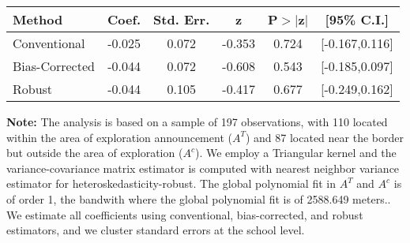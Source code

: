 \begin{table}[htbp]\centering
 \footnotesize 
\begin{tabular}{lccccc}
\hline\hline
Method & Coef. & Std. Err. & z & P$>|$z$|$ & [95\% C.I.] \\ 
\hline \hline  
Conventional & -0.025 & 0.072 & -0.353 & 0.724 & [-0.167,0.116] \\ 
 Bias-Corrected & -0.044 & 0.072 & -0.608 & 0.543 & [-0.185,0.097] \\ 
Robust & -0.044 & 0.105 & -0.417 & 0.677 & [-0.249,0.162] \\ 
  \hline\hline
\end{tabular}
\label{table:rd}
\begin{tablenotes} 
  \justifying \tiny \textbf{Note: }    
   The analysis is based on a sample of 197 observations, with 110 located within the area of exploration announcement ($A^{T}$) and 87 located near the border but outside the area of exploration  ($A^{c}$). 
           We employ a Triangular kernel and the variance-covariance matrix estimator is computed with nearest neighbor variance estimator for heteroskedasticity-robust. The global polynomial fit in  $A^{T}$ and $A^{c}$ is of order 1, the bandwith where the global polynomial fit is of 2588.649 meters.. We estimate all coefficients using conventional, bias-corrected, and robust estimators, and we cluster standard errors at the school level. \end{tablenotes} 
 \end{table} 
